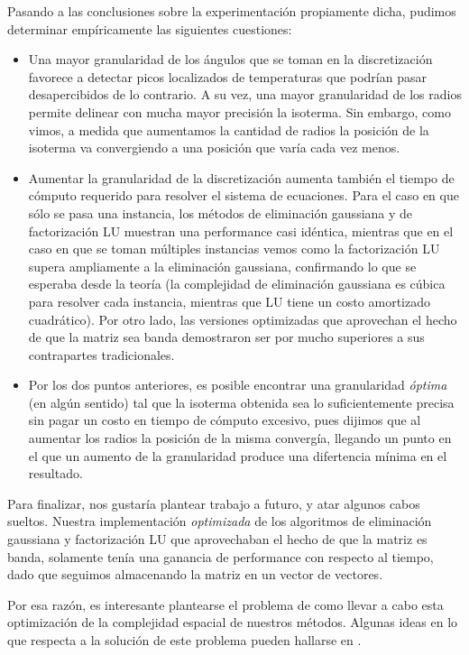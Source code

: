 Pasando a las conclusiones sobre la experimentación propiamente dicha, pudimos determinar empíricamente las siguientes cuestiones:
\begin{itemize}
\item Una mayor granularidad de los ángulos que se toman en la discretización favorece a detectar picos localizados de temperaturas que podrían pasar desapercibidos de lo contrario. A su vez, una mayor granularidad de los radios permite delinear con mucha mayor precisión la isoterma. Sin embargo, como vimos, a medida que aumentamos la cantidad de radios la posición de la isoterma va convergiendo a una posición que varía cada vez menos.
\item Aumentar la granularidad de la discretización aumenta también el tiempo de cómputo requerido para resolver el sistema de ecuaciones. Para el caso en que sólo se pasa una instancia, los métodos de eliminación gaussiana y de factorización LU muestran una performance casi idéntica, mientras que en el caso en que se toman múltiples instancias vemos como la factorización LU supera ampliamente a la eliminación gaussiana, confirmando lo que se esperaba desde la teoría (la complejidad de eliminación gaussiana es cúbica para resolver cada instancia, mientras que LU tiene un costo amortizado cuadrático). Por otro lado, las versiones optimizadas que aprovechan el hecho de que la matriz sea banda demostraron ser por mucho superiores a sus contrapartes tradicionales.
\item Por los dos puntos anteriores, es posible encontrar una granularidad \emph{óptima} (en algún sentido) tal que la isoterma obtenida sea lo suficientemente precisa sin pagar un costo en tiempo de cómputo excesivo, pues dijimos que al aumentar los radios la posición de la misma convergía, llegando un punto en el que un aumento de la granularidad produce una difertencia mínima en el resultado.
 \end{itemize}

Para finalizar, nos gustaría plantear trabajo a futuro, y atar algunos cabos sueltos. Nuestra implementación \emph{optimizada} de los algoritmos de eliminación gaussiana y factorización LU que aprovechaban el hecho de que la matriz es banda, solamente tenía una ganancia de performance con respecto al tiempo, dado que seguimos almacenando la matriz en un vector de vectores.

Por esa razón, es interesante plantearse el problema de como llevar a cabo esta optimización de la complejidad espacial de nuestros métodos. Algunas ideas en lo que respecta a la solución de este problema pueden hallarse en \cite[Cap. 4.3]{golub}. 





